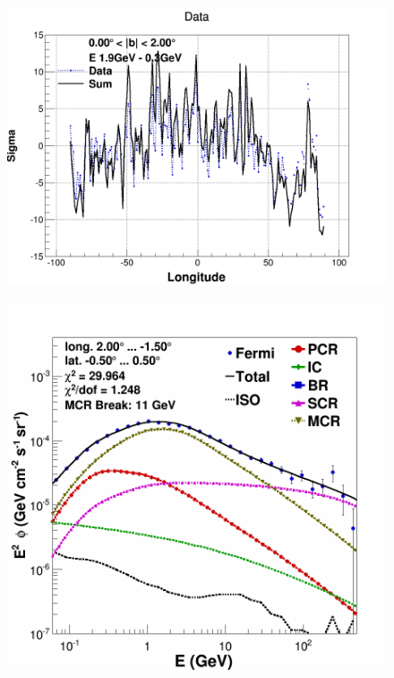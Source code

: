 \begin{figure}[h]
  \centering
  \begin{minipage}[h]{0.45\textwidth}
	  \centering
	  \includegraphics[width=\linewidth]{pic/results/MCRonly_weniger_sum_0-2.png}	  
  	  \subcaption{}
	  \label{fig:MCRonly_weniger}
  \end{minipage}
  \hfill
  \begin{minipage}[h]{0.45\textwidth}
	  \centering
	  \includegraphics[width=\linewidth]{pic/results/MCRonly_CMZ.png}

\end{minipage}
\end{figure}
